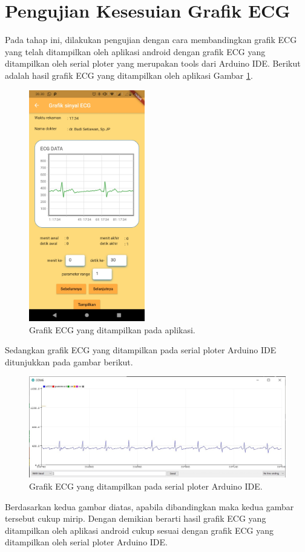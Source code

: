 \section{Pengujian Kesesuian Grafik ECG}
\vspace{1ex}

Pada tahap ini, dilakukan pengujian dengan cara membandingkan grafik ECG yang telah ditampilkan oleh aplikasi android dengan grafik ECG yang ditampilkan oleh serial ploter yang merupakan tools dari Arduino IDE. Berikut adalah hasil grafik ECG yang ditampilkan oleh aplikasi Gambar \ref{fig:4.0}.

\begin{figure}[H] \centering
	\includegraphics[width=0.45\textwidth]{img/grafikECGapps.jpg}
	\caption{Grafik ECG yang ditampilkan pada aplikasi.}
	\label{fig:4.0}
\end{figure}
Sedangkan grafik ECG yang ditampilkan pada serial ploter Arduino IDE ditunjukkan pada gambar berikut.
\begin{figure}[H] \centering
	\includegraphics[width=1\textwidth]{img/ujisesuaidataIDE.jpg}
	\caption{Grafik ECG yang ditampilkan pada serial ploter Arduino IDE.}
	\label{fig:4.1}
\end{figure}

Berdasarkan kedua gambar diatas, apabila dibandingkan maka kedua gambar tersebut cukup mirip. Dengan demikian berarti hasil grafik ECG yang ditampilkan oleh aplikasi android cukup sesuai dengan grafik ECG yang ditampilkan oleh serial ploter Arduino IDE.
\vspace{1ex}

